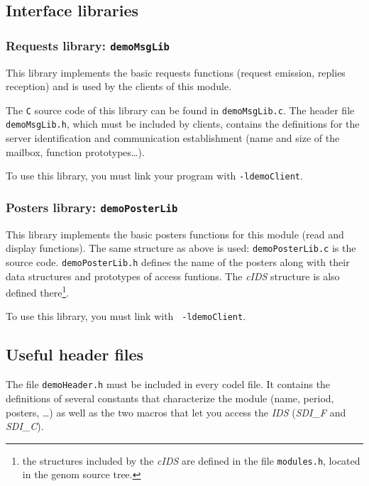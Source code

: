 \subsection{Interface libraries}

\subsubsection{Requests library: \texttt{demoMsgLib}}

This library implements  the basic requests  functions (request emission,
replies reception) and is used by the clients of this module.

The \texttt{C}  source code    of  this  library  can be   found  in  
\texttt{demoMsgLib.c}.  The header
file \texttt{demoMsgLib.h}, which must  be included by clients, contains the
definitions for the server identification and communication establishment
(name and size of the mailbox, function prototypes\ldots).

To use this  library, you must link your  program with  
\texttt{-ldemoClient}. 


\subsubsection{Posters library: \texttt{demoPosterLib}}

This library implements the basic posters functions for this module (read
and display   functions).  The same    structure as above  is used:  
\texttt{demoPosterLib.c} is  the  source code. 
\texttt{demoPosterLib.h}   defines the name  of  the
posters along  with  their data structures and prototypes of access
funtions.
The  \emph{cIDS} structure is
also defined there\footnote{the structures included by the \emph{cIDS} are
defined in the file \texttt{modules.h}, located in the genom source tree.}.

To  use this library,  you must link  with  \texttt{
-ldemoClient}.


\subsection{Useful header files}

The file \texttt{demoHeader.h} must  be included  in every  codel file.  It
contains the definitions of several constants that characterize the module
(name, period, posters, \ldots)  as well as the two  macros that let  you
access the \emph{IDS} (\emph{SDI\_F} and \emph{SDI\_C}).

